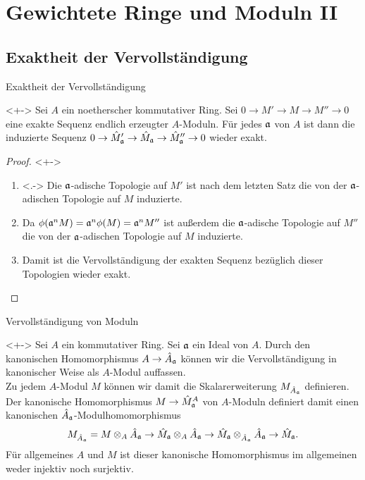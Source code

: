 \section{Gewichtete Ringe und Moduln II}

\subsection{Exaktheit der Vervollständigung}

\begin{frame}{Exaktheit der Vervollständigung}
	\begin{proposition}<+->
		Sei \(A\) ein noetherscher kommutativer Ring. Sei \(0 \to M' \to M \to
		M'' \to 0\) eine exakte Sequenz endlich erzeugter \(A\)-Moduln.
		Für jedes \(\mathfrak{a}\) von \(A\) ist dann die induzierte Sequenz
		\(0 \to \hat M'_{\mathfrak{a}} \to \hat M_{\mathfrak{a}} \to \hat M''_{\mathfrak{a}}
		\to 0\) wieder exakt.
	\end{proposition}
	\begin{proof}<+->
		\begin{enumerate}[<+->]
		\item<.->
			Die \(\mathfrak{a}\)-adische Topologie auf \(M'\) ist nach dem 
			letzten Satz die von
			der \(\mathfrak{a}\)-adischen Topologie auf \(M\) induzierte. 
		\item
			Da \(\phi(\mathfrak{a}^n M) = \mathfrak{a}^n \phi(M) = \mathfrak{a}^n M''\)
			ist außerdem die \(\mathfrak{a}\)-adische Topologie auf \(M''\) die
			von der \(\mathfrak{a}\)-adischen Topologie auf \(M\) induzierte.
		\item
			Damit ist die Vervollständigung der exakten Sequenz bezüglich dieser
			Topologien wieder exakt.
			\qedhere
		\end{enumerate}
	\end{proof}
\end{frame}

\begin{frame}{Vervollständigung von Moduln}
	\begin{remark}<+->
		Sei \(A\) ein kommutativer Ring. Sei \(\mathfrak{a}\) ein
		Ideal von \(A\). Durch den kanonischen Homomorphismus \(A \to \hat A_{\mathfrak{a}}\)
		können wir die Vervollständigung in kanonischer Weise als \(A\)-Modul
		auffassen.
		\\
		Zu jedem \(A\)-Modul \(M\) können wir damit die Skalarerweiterung
		\(M_{\hat A_{\mathfrak{a}}}\) definieren. Der kanonische Homomorphismus
		\(M \to \hat M_{\mathfrak{a}}^A\) von \(A\)-Moduln definiert damit einen
		kanonischen \(\hat A_{\mathfrak{a}}\)-Modulhomomorphismus
		\[
			M_{\hat A_{\mathfrak{a}}}
			= M \otimes_A \hat A_{\mathfrak{a}} \to \hat M_{\mathfrak{a}} \otimes_A
			\hat A_{\mathfrak{a}} \to \hat M_{\mathfrak{a}} \otimes_{\hat A_{\mathfrak{a}}}
			\hat A_{\mathfrak{a}} \to \hat M_{\mathfrak{a}}.
		\]
		Für allgemeines \(A\) und \(M\) ist dieser kanonische Homomorphismus
		im allgemeinen weder injektiv noch surjektiv.
	\end{remark}
\end{frame}

